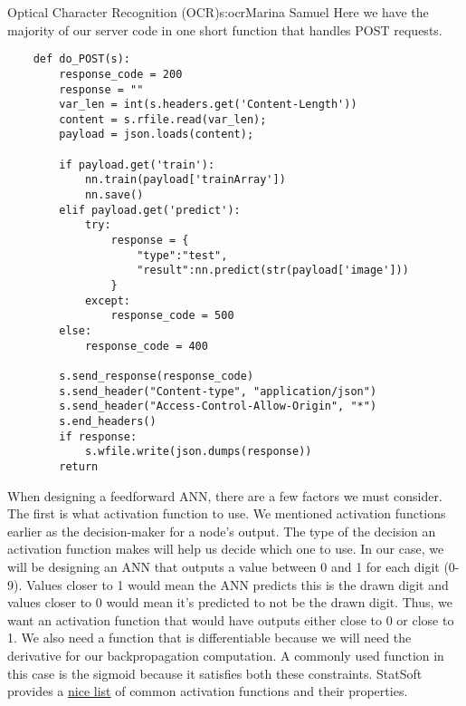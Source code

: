 \begin{aosachapter}{Optical Character Recognition (OCR)}{s:ocr}{Marina Samuel}
Here we have the majority of our server code in one short function that
handles POST requests.

\begin{verbatim}
    def do_POST(s):
        response_code = 200
        response = ""
        var_len = int(s.headers.get('Content-Length'))
        content = s.rfile.read(var_len);
        payload = json.loads(content);

        if payload.get('train'):
            nn.train(payload['trainArray'])
            nn.save()
        elif payload.get('predict'):
            try:
                response = {
                    "type":"test", 
                    "result":nn.predict(str(payload['image']))
                }
            except:
                response_code = 500
        else:
            response_code = 400

        s.send_response(response_code)
        s.send_header("Content-type", "application/json")
        s.send_header("Access-Control-Allow-Origin", "*")
        s.end_headers()
        if response:
            s.wfile.write(json.dumps(response))
        return
\end{verbatim}

\label{designing-a-feedforward-ann-neuralux5fnetworkux5fdesign.py}

\label{sec.ocr.feedforward} When designing a feedforward ANN, there are
a few factors we must consider. The first is what activation function to
use. We mentioned activation functions earlier as the decision-maker for
a node's output. The type of the decision an activation function makes
will help us decide which one to use. In our case, we will be designing
an ANN that outputs a value between 0 and 1 for each digit (0-9). Values
closer to 1 would mean the ANN predicts this is the drawn digit and
values closer to 0 would mean it's predicted to not be the drawn digit.
Thus, we want an activation function that would have outputs either
close to 0 or close to 1. We also need a function that is differentiable
because we will need the derivative for our backpropagation computation.
A commonly used function in this case is the sigmoid because it
satisfies both these constraints. StatSoft provides a
\href{http://www.fmi.uni-sofia.bg/fmi/statist/education/textbook/eng/glosa.html}{nice
list} of common activation functions and their properties.


\end{aosachapter}
